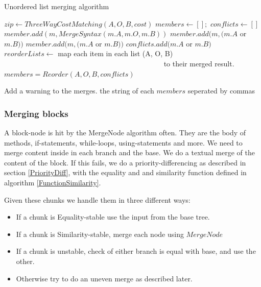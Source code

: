 \documentclass[11pt]{article}
\begin{document}
\begin{algorithm}
  \caption{Unordered list merging algorithm}
  \label{Listmerger}
\begin{algorithmic}
    \State $zip \gets ThreeWayCostMatching(A, O, B, cost)$
    \State $members \gets [];$
   	\State $conflicts \gets []$
           \State $member.add(m, MergeSyntax(m.A, m.O, m.B))$
			\State $member.add(m, (m.A$ or $m.B ))$
			\State $member.add(m, (m.A$ or $m.B ))$
			\State $conflicts.add(m.A$ or $m.B )$
		\EndIf
		\State $reorderLists \gets $ map each item in each list (A, O, B)
		\State ~~~~~~~~~~~~~~~~~~~~~~~~~~~~~~~~~~~~~~~~~~~~ to their merged result.
		\State $members = Reorder(A, O, B, conflicts)$
	\EndFor

        \State Add a warning to the merges.
    \EndFor
	\State \Return the string of each $members$ seperated by commas
\EndFunction
\end{algorithmic}
\end{algorithm}

\subsubsection{Merging blocks}
A block-node is hit by the MergeNode algorithm often. They are the body of methods, if-statements, while-loops, using-statements and more. We need to merge content inside in each branch and the base. We do a textual merge of the content of the block. If this fails, we do a priority-differencing as described in section \ref{PriorityDiff}, with the equality and and similarity function defined in algorithm \ref{FunctionSimilarity}.

Given these chunks we handle them in three different ways: 

\begin{itemize}
	\item If a chunk is Equality-stable use the input from the base tree.
	\item If a chunk is Similarity-stable, merge each node using $MergeNode$
	\item If a chunk is unstable, check of either branch is equal with base, and use the other.
	\item Otherwise try to do an uneven merge as described later.
\end{itemize}
\end{document}
